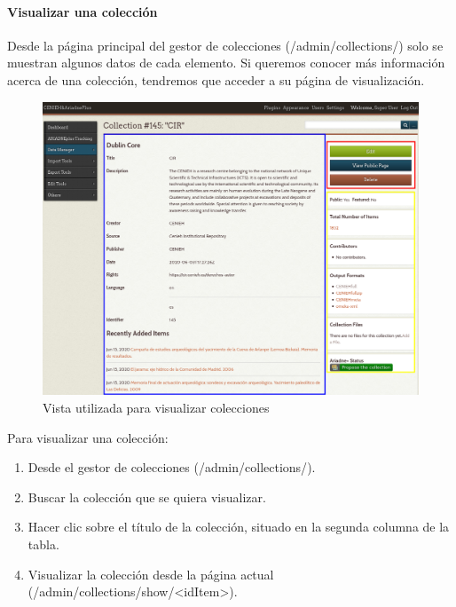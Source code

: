 \documentclass[
]{article}
\providecommand{\tightlist}{%
  \setlength{\itemsep}{0pt}\setlength{\parskip}{0pt}}
\begin{document}
\hypertarget{visualizar-una-colecciuxf3n}{%
\paragraph{Visualizar una colección}\label{visualizar-una-colecciuxf3n}}

Desde la página principal del gestor de colecciones
({/admin/collections/}) solo se muestran algunos datos de cada elemento.
Si queremos conocer más información acerca de una colección, tendremos
que acceder a su página de visualización.

\begin{figure}
\hypertarget{show-collections-view}{%
\centering
\includegraphics{../_static/images/show-collections-view.png}
\caption{Vista utilizada para visualizar
colecciones}\label{show-collections-view}
}
\end{figure}

Para visualizar una colección:

\begin{enumerate}
\def\labelenumi{\arabic{enumi}.}
\tightlist
\item
  Desde el gestor de colecciones ({/admin/collections/}).
\item
  Buscar la colección que se quiera visualizar.
\item
  Hacer clic sobre el título de la colección, situado en la segunda
  columna de la tabla.
\item
  Visualizar la colección desde la página actual
  ({/admin/collections/show/\textless idItem\textgreater{}}).
\end{enumerate}
\end{document}
